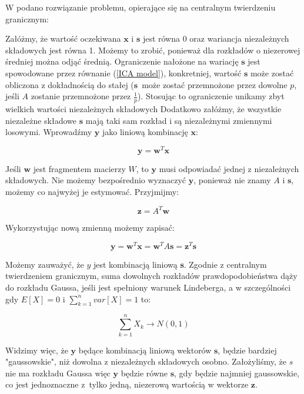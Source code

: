 \documentclass[oneside, eng]{mgr}
\newcommand{\bb}{\textbf}
\begin{document}
W \cite{ICA} podano rozwiązanie problemu, opierające się na centralnym twierdzeniu granicznym:

Załóżmy, że wartość oczekiwana $\bb{x}$ i $\bb{s}$ jest równa 0 oraz wariancja niezależnych składowych jest równa 1. Możemy to zrobić, ponieważ dla rozkładów o niezerowej średniej można odjąć średnią. Ograniczenie nałożone na wariację $\bb{s}$ jest spowodowane przez równanie (\ref{ICA model}), konkretniej, wartość $\bb{s}$ może zostać obliczona z dokładnością do stałej ($\bb{s}$~może zostać przemnożone przez dowolne $p$, jeśli $A$ zostanie przemnożone przez $\frac{1}{p}$). Stosując to ograniczenie unikamy zbyt wielkich wartości niezależnych składowych  Dodatkowo załóżmy, że wszystkie niezależne składowe $\bb{s}$ mają taki sam rozkład i są niezależnymi zmiennymi losowymi. Wprowadźmy $\bb{y}$ jako liniową kombinację $\bb{x}$:

\begin{equation}
	\bb{y} = \bb{w}^T \bb{x}
\end{equation}

Jeśli $\bb{w}$ jest fragmentem macierzy $W$, to $\bb{y}$ musi odpowiadać jednej z niezależnych składowych. Nie możemy bezpośrednio wyznaczyć $\bb{y}$, ponieważ nie znamy $A$ i $\bb{s}$, możemy co najwyżej je estymować. Przyjmijmy:

\begin{equation}
	\bb{z} = A^T \bb{w}
\end{equation}

Wykorzystując nową zmienną możemy zapisać:

\begin{equation}
	\bb{y} = \bb{w}^T \bb{x} = \bb{w}^T A \bb{s} = \bb{z}^T \bb{s} 
\end{equation}

Możemy zauważyć, że $y$ jest kombinacją liniową \bb{s}. Zgodnie z centralnym twierdzeniem granicznym, suma dowolnych rozkładów prawdopodobieństwa dąży do rozkładu Gaussa, jeśli jest spełniony warunek Lindeberga, a w szczególności gdy $E[X] = 0$ i $\sum_{k=1}^{n}var[X] = 1$ to:

\begin{equation}
	\sum_{k=1}^{n} X_k \to N(0,1)
\end{equation}

Widzimy więc, że $\bb{y}$ będące kombinacją liniową wektorów $\bb{s}$, będzie bardziej "gaussowskie", niż dowolna z niezależnych składowych osobno. Założyliśmy, że $s$ nie ma rozkładu Gaussa więc $\bb{y}$ będzie równe $\bb{s}$, gdy będzie najmniej gaussowskie, co jest jednoznaczne z~tylko jedną, niezerową wartością w wektorze $\bb{z}$.
\end{document}
